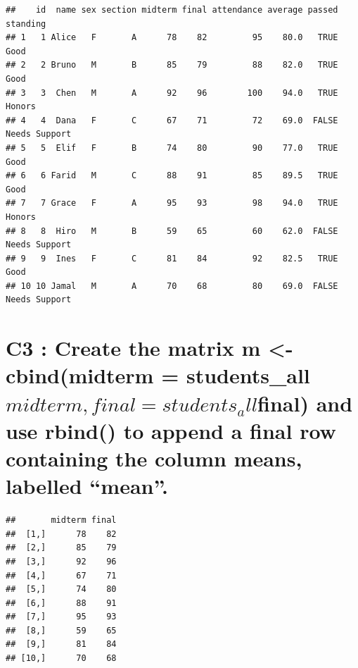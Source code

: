 \documentclass[
]{article}
\newenvironment{Shaded}{\begin{snugshade}}{\end{snugshade}}
\newcommand{\AttributeTok}[1]{\textcolor[rgb]{0.13,0.29,0.53}{#1}}
\newcommand{\FunctionTok}[1]{\textcolor[rgb]{0.13,0.29,0.53}{\textbf{#1}}}
\newcommand{\NormalTok}[1]{#1}
\newcommand{\OtherTok}[1]{\textcolor[rgb]{0.56,0.35,0.01}{#1}}
\newcommand{\SpecialCharTok}[1]{\textcolor[rgb]{0.81,0.36,0.00}{\textbf{#1}}}
\begin{document}
\begin{verbatim}
##    id  name sex section midterm final attendance average passed      standing
## 1   1 Alice   F       A      78    82         95    80.0   TRUE          Good
## 2   2 Bruno   M       B      85    79         88    82.0   TRUE          Good
## 3   3  Chen   M       A      92    96        100    94.0   TRUE        Honors
## 4   4  Dana   F       C      67    71         72    69.0  FALSE Needs Support
## 5   5  Elif   F       B      74    80         90    77.0   TRUE          Good
## 6   6 Farid   M       C      88    91         85    89.5   TRUE          Good
## 7   7 Grace   F       A      95    93         98    94.0   TRUE        Honors
## 8   8  Hiro   M       B      59    65         60    62.0  FALSE Needs Support
## 9   9  Ines   F       C      81    84         92    82.5   TRUE          Good
## 10 10 Jamal   M       A      70    68         80    69.0  FALSE Needs Support
\end{verbatim}

\section{\texorpdfstring{C3 : Create the matrix m \textless-
cbind(midterm = students\_all\(midterm, final = students_all\)final) and
use rbind() to append a final row containing the column means, labelled
``mean''.}{C3 : Create the matrix m \textless- cbind(midterm = students\_allmidterm, final = students\_allfinal) and use rbind() to append a final row containing the column means, labelled ``mean''.}}\label{c3-create-the-matrix-m---cbindmidterm-students_allmidterm-final-students_allfinal-and-use-rbind-to-append-a-final-row-containing-the-column-means-labelled-mean.}

\begin{Shaded}
\end{Shaded}

\begin{verbatim}
##       midterm final
##  [1,]      78    82
##  [2,]      85    79
##  [3,]      92    96
##  [4,]      67    71
##  [5,]      74    80
##  [6,]      88    91
##  [7,]      95    93
##  [8,]      59    65
##  [9,]      81    84
## [10,]      70    68
\end{verbatim}
\end{document}
